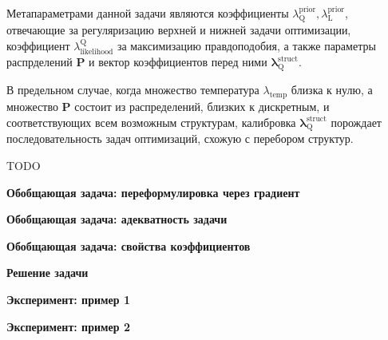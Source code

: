 Метапараметрами данной задачи являются коэффициенты $\lambda^\text{prior}_\text{Q}, \lambda^\text{prior}_\text{L}$, отвечающие за регуляризацию верхней и нижней задачи оптимизации, коэффициент $\lambda_\text{likelihood}^\text{Q}$ за максимизацию правдоподобия, а также параметры распрделений $\mathbf{P}$ и вектор коэффициентов перед ними $\boldsymbol{\lambda}^\text{struct}_\text{Q}$. 

В предельном случае, когда множество температура $\lambda_\text{temp}$ близка к нулю, а множество $\mathbf{P}$ состоит из распределений, близких к дискретным, и соответствующих всем возможным структурам, калибровка $\boldsymbol{\lambda}^\text{struct}_\text{Q}$ порождает последовательность задач оптимизаций, схожую с перебором структур. 

TODO

\textbf{Обобщающая задача: переформулировка через градиент}

\textbf{Обобщающая задача: адекватность задачи}

\textbf{Обобщающая задача: свойства коэффициентов}

\textbf{Решение задачи}

\textbf{Эксперимент: пример 1}

\textbf{Эксперимент: пример 2}









